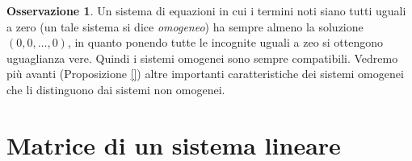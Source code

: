 \documentclass{book}
\theoremstyle{definition}
\newtheorem{oss}{Osservazione}[section]
\theoremstyle{plain}
\begin{document}
\begin{oss}
  \label{oss:eqlinematrici1}
  Un sistema di equazioni in cui i termini noti siano tutti uguali a zero
  (un tale sistema si dice \textit{omogeneo}) ha sempre almeno la
  soluzione $(0,0,\dots,0)$, in quanto ponendo tutte le incognite uguali
  a zeo si ottengono uguaglianza vere. Quindi i sistemi omogenei sono
  sempre compatibili. Vedremo più avanti (Proposizione \ref{}) altre
  importanti caratteristiche dei sistemi omogenei che li distinguono dai
  sistemi non omogenei.
\end{oss}

\section{Matrice di un sistema lineare}
\label{sec:matricediunsistlineare}
\end{document}
